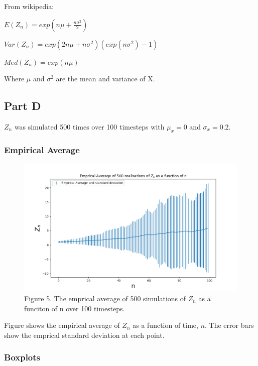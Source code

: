 \documentclass{article}
\begin{document}
\bigskip

From wikipedia: 

$E(Z_n) = exp(n\mu + \frac{n\sigma^2}{2})$

$Var(Z_n) = exp(2n \mu + n\sigma^2)(exp(n\sigma^2)-1)$

$Med(Z_n) = exp(n\mu)$

Where $\mu$ and $\sigma^2$ are the mean and variance of X.

\subsection{Part D}
$Z_n$ was simulated 500 times over 100 timesteps with $\mu_x=0$ and $\sigma_x=0.2$.

\subsubsection{Empirical Average}

\begin{figure}[H]
\includegraphics[scale=0.5]{empirical_average_1.png} 
\small{Figure 5. The emprical average of 500 simulations of $Z_n$ as a funciton of n over 100 timesteps. }
\end{figure}


Figure shows the empirical average of $Z_n$ as a function of time, $n$. The error bars show the emprical standard deviation at each point. 

\subsubsection{Boxplots}
\end{document}
